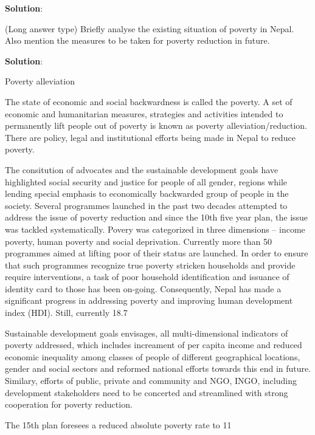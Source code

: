 \documentclass[
]{book}
\newcommand{\question}{\item}
\newenvironment{solution}{ {\bfseries Solution}:}{}
\begin{document}
\begin{questions}
\begin{solution}
\end{solution}

\question (Long answer type) Briefly analyse the existing situation of poverty in Nepal. Also mention the measures to be taken for poverty reduction in future.

\begin{solution}

Poverty alleviation

The state of economic and social backwardness is called the poverty. A set of economic and humanitarian measures, strategies and activities intended to permanently lift people out of poverty is known as poverty alleviation/reduction. There are policy, legal and institutional efforts being made in Nepal to reduce poverty.

The consitution of advocates and the sustainable development goals have highlighted social security and justice for people of all gender, regions while lending special emphasis to economically backwarded group of people in the society. Several programmes launched in the past two decades attempted to address the issue of poverty reduction and since the 10th five year plan, the issue was tackled systematically. Povery was categorized in three dimensions -- income poverty, human poverty and social deprivation. Currently more than 50 programmes aimed at lifting poor of their status are launched. In order to ensure that such programmes recognize true poverty stricken households and provide require interventions, a task of poor household identification and issuance of identity card to those has been on-going. Consequently, Nepal has made a significant progress in addressing poverty and improving human development index (HDI). Still, currently 18.7%

Sustainable development goals envisages, all multi-dimensional indicators of poverty addressed, which includes increament of per capita income and reduced economic inequality among classes of people of different geographical locations, gender and social sectors and reformed national efforts towards this end in future. Similary, efforts of public, private and community and NGO, INGO, including development stakeholders need to be concerted and streamlined with strong cooperation for poverty reduction.

The 15th plan foresees a reduced absolute poverty rate to 11%


\end{solution}
\end{questions}
\end{document}
